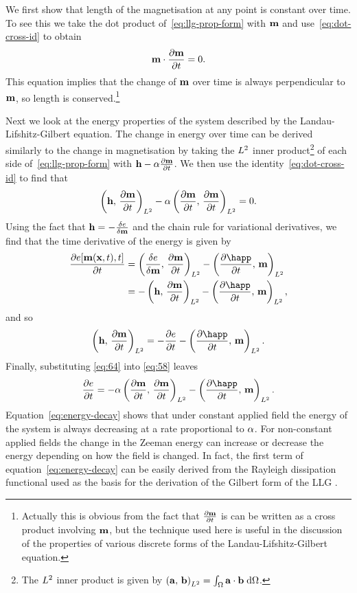 We first show that length of the magnetisation at any point is constant over time.
To see this we take the dot product of~\cref{eq:llg-prop-form} with $\mathbf{m}$ and use~\cref{eq:dot-cross-id} to obtain
\begin{equation}
  \label{eq:56}
  \mathbf{m} \cdot \frac{\partial \mathbf{m}}{\partial t} = 0.
\end{equation}
This equation implies that the change of $\mathbf{m}$ over time is always perpendicular to $\mathbf{m}$, so length is conserved.\footnote{Actually this is obvious from the fact that $\frac{\partial \mathbf{m}}{\partial t}$ is can be written as a cross product involving $\mathbf{m}$, but the technique used here is useful in the discussion of the properties of various discrete forms of the Landau-Lifshitz-Gilbert equation.}

Next we look at the energy properties of the system described by the Landau-Lifshitz-Gilbert equation.
The change in energy over time can be derived similarly to the change in magnetisation by taking the $L^2$ inner product\footnote{The $L^2$ inner product is given by $\left({\mathbf{a}},\, {\mathbf{b}} \right)_{L^2} = \int_\Omega {\mathbf{a}} \cdot {\mathbf{b}} {\; \text{d}}\Omega$.} of each side of~\cref{eq:llg-prop-form} with $\mathbf{h} - \alpha \frac{\partial \mathbf{m}}{\partial t}$.
We then use the identity~\cref{eq:dot-cross-id} to find that
\begin{equation}
  \label{eq:58}
  \left(\mathbf{h},\, \frac{\partial \mathbf{m}}{\partial t} \right)_{L^2} - \alpha \left(\frac{\partial \mathbf{m}}{\partial t},\, \frac{\partial \mathbf{m}}{\partial t} \right)_{L^2} = 0.
\end{equation}
Using the fact that $\mathbf{h} = -\frac{\delta e}{\delta \mathbf{m}}$ and the chain rule for variational derivatives, we find that the time derivative of the energy is given by
\begin{align*}
  \pd{\e[\mv(\xv, t), t]}{t} &= \ltip{\vd{e}{\mv}}{\dmdt} - \ltip{\pd{\happ}{t}}{\mv} \\
                             &= -\ltip{\hv}{\dmdt} - \ltip{\pd{\happ}{t}}{\mv},
\end{align*}
and so
\begin{equation}
  \ltip{\hv}{\dmdt} = -\pd{\e}{t} - \ltip{\pd{\happ}{t}}{\mv}.
  \label{eq:64}
\end{equation}
Finally, substituting \cref{eq:64} into \cref{eq:58} leaves
\begin{equation}
  \label{eq:energy-decay}
  \pd{\e}{t} = -\dampc \ltip{\dmdt}{\dmdt} - \ltip{\pd{\happ}{t}}{\mv}.
\end{equation}
Equation~\cref{eq:energy-decay} shows that under constant applied field the energy of the system is always decreasing at a rate proportional to $\alpha$.
For non-constant applied fields the change in the Zeeman energy can increase or decrease the energy depending on how the field is changed. %
In fact, the first term of equation~\cref{eq:energy-decay} can be easily derived from the Rayleigh dissipation functional used as the basis for the derivation of the Gilbert form of the LLG \cite{Gilbert2004}.

